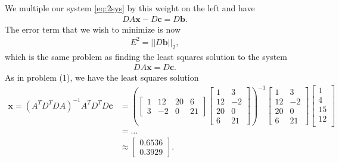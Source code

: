 \documentclass[10pt]{article}
\renewcommand{\vec}{\mathbf}
\begin{document}
\begin{enumerate}
  We multiple our system \eqref{eq:2sys} by this weight on the left and have \begin{align*}
      DA\vec{x} - D\vec{c} = D\vec{b}.
  \end{align*} The error term that we wish to minimize is now \begin{align*}
      E^2 = ||D\vec{b}||_2,
  \end{align*} which is the same problem as finding the least squares solution to the system \begin{align*}
      DA\vec{x} = D\vec{c}.
  \end{align*} As in problem (1), we have the least squares solution \begin{align*}
      \vec{x} = (A^TD^TDA)^{-1}A^TD^TD\vec{c} &= \left(\begin{bmatrix}1 & 12 & 20 & 6\\3 & -2 & 0 & 21\end{bmatrix}\begin{bmatrix}
        1 & 3 \\ 12 & -2 \\ 20 & 0 \\ 6 & 21
      \end{bmatrix}\right)^{-1}\begin{bmatrix}
      1 & 3 \\ 12 & -2 \\ 20 & 0 \\ 6 & 21
    \end{bmatrix}\begin{bmatrix}
      1 \\ 4 \\ 15 \\ 12 \\
    \end{bmatrix} \\
    &= \dots \\
    &\approx \begin{bmatrix}
      0.6536 \\ 0.3929
    \end{bmatrix}.
  \end{align*}


\end{enumerate}
\end{document}
